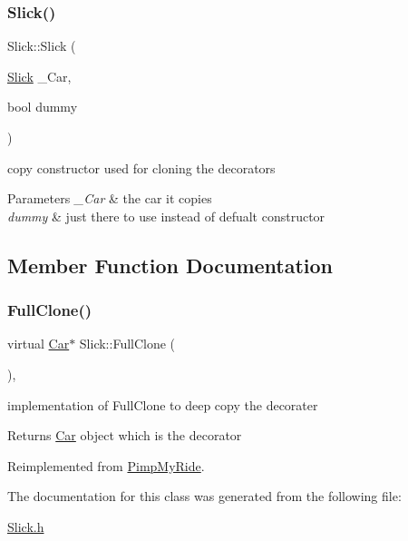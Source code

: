 \subsubsection{\texorpdfstring{Slick()}{Slick()}\hspace{0.1cm}{\footnotesize\ttfamily [2/2]}}
{\footnotesize\ttfamily Slick\+::\+Slick (\begin{DoxyParamCaption}\item[{\mbox{\hyperlink{class_slick}{Slick}}}]{\+\_\+\+Car,  }\item[{bool}]{dummy }\end{DoxyParamCaption})\hspace{0.3cm}{\ttfamily [inline]}}

copy constructor used for cloning the decorators 
\begin{DoxyParams}{Parameters}
{\em \+\_\+\+Car} & the car it copies \\
\hline
{\em dummy} & just there to use instead of defualt constructor \\
\hline
\end{DoxyParams}


\subsection{Member Function Documentation}
\mbox{\label{class_slick_a09178f75aaba34e79992c66eac80974e}} 
\subsubsection{\texorpdfstring{Full\+Clone()}{FullClone()}}
{\footnotesize\ttfamily virtual \mbox{\hyperlink{class_car}{Car}}$\ast$ Slick\+::\+Full\+Clone (\begin{DoxyParamCaption}{ }\end{DoxyParamCaption})\hspace{0.3cm}{\ttfamily [inline]}, {\ttfamily [virtual]}}

implementation of Full\+Clone to deep copy the decorater \begin{DoxyReturn}{Returns}
\mbox{\hyperlink{class_car}{Car}} object which is the decorator 
\end{DoxyReturn}


Reimplemented from \mbox{\hyperlink{class_pimp_my_ride_afce12a1a761727eebec707924521d0e2}{Pimp\+My\+Ride}}.



The documentation for this class was generated from the following file\+:\begin{DoxyCompactItemize}
\item 
\mbox{\hyperlink{_slick_8h}{Slick.\+h}}\end{DoxyCompactItemize}
